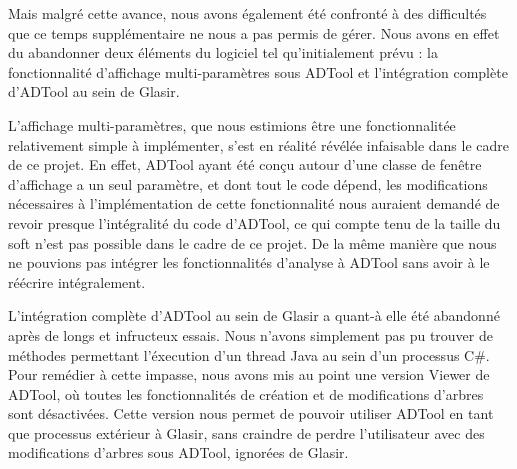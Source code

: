 Mais malgré cette avance, nous avons également été confronté à des difficultés que ce temps supplémentaire ne nous a pas permis de gérer. Nous avons en effet du abandonner deux éléments du logiciel tel qu'initialement prévu : la fonctionnalité d'affichage multi-paramètres sous ADTool et l'intégration complète d'ADTool au sein de Glasir.

L'affichage multi-paramètres, que nous estimions être une fonctionnalitée relativement simple à implémenter, s'est en réalité révélée infaisable dans le cadre de ce projet. En effet, ADTool ayant été conçu autour d'une classe de fenêtre d'affichage a un seul paramètre, et dont tout le code dépend, les modifications nécessaires à l'implémentation de cette fonctionnalité nous auraient demandé de revoir presque l'intégralité du code d'ADTool, ce qui compte tenu de la taille du soft n'est pas possible dans le cadre de ce projet. De la même manière que nous ne pouvions pas intégrer les fonctionnalités d'analyse à ADTool sans avoir à le réécrire intégralement.

L'intégration complète d'ADTool au sein de Glasir a quant-à elle été abandonné après de longs et infructeux essais. Nous n'avons simplement pas pu trouver de méthodes permettant l'éxecution d'un thread Java au sein d'un processus C\#. Pour remédier à cette impasse, nous avons mis au point une version \og Viewer \fg de ADTool, où toutes les fonctionnalités de création et de modifications d'arbres sont désactivées. Cette version nous permet de pouvoir utiliser ADTool en tant que processus extérieur à Glasir, sans craindre de perdre l'utilisateur avec des modifications d'arbres sous ADTool, ignorées de Glasir.  

